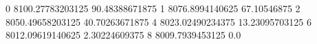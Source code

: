 0 8100.27783203125 90.48388671875
1 8076.8994140625 67.10546875
2 8050.49658203125 40.70263671875
4 8023.02490234375 13.23095703125
6 8012.09619140625 2.30224609375
8 8009.7939453125 0.0
